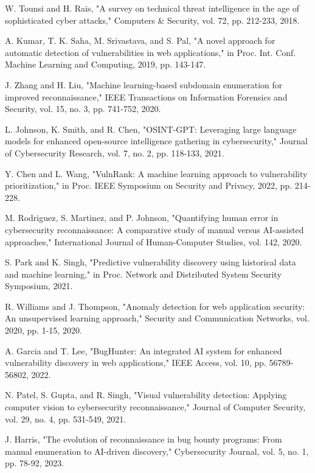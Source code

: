 \documentclass[conference]{IEEEtran}
\begin{document}

\begin{thebibliography}{00}
 W. Tounsi and H. Rais, "A survey on technical threat intelligence in the age of sophisticated cyber attacks," Computers \& Security, vol. 72, pp. 212-233, 2018.

 A. Kumar, T. K. Saha, M. Srivastava, and S. Pal, "A novel approach for automatic detection of vulnerabilities in web applications," in Proc. Int. Conf. Machine Learning and Computing, 2019, pp. 143-147.

 J. Zhang and H. Liu, "Machine learning-based subdomain enumeration for improved reconnaissance," IEEE Transactions on Information Forensics and Security, vol. 15, no. 3, pp. 741-752, 2020.

 L. Johnson, K. Smith, and R. Chen, "OSINT-GPT: Leveraging large language models for enhanced open-source intelligence gathering in cybersecurity," Journal of Cybersecurity Research, vol. 7, no. 2, pp. 118-133, 2021.

 Y. Chen and L. Wang, "VulnRank: A machine learning approach to vulnerability prioritization," in Proc. IEEE Symposium on Security and Privacy, 2022, pp. 214-228.

 M. Rodriguez, S. Martinez, and P. Johnson, "Quantifying human error in cybersecurity reconnaissance: A comparative study of manual versus AI-assisted approaches," International Journal of Human-Computer Studies, vol. 142, 2020.

 S. Park and K. Singh, "Predictive vulnerability discovery using historical data and machine learning," in Proc. Network and Distributed System Security Symposium, 2021.

 R. Williams and J. Thompson, "Anomaly detection for web application security: An unsupervised learning approach," Security and Communication Networks, vol. 2020, pp. 1-15, 2020.

 A. Garcia and T. Lee, "BugHunter: An integrated AI system for enhanced vulnerability discovery in web applications," IEEE Access, vol. 10, pp. 56789-56802, 2022.

 N. Patel, S. Gupta, and R. Singh, "Visual vulnerability detection: Applying computer vision to cybersecurity reconnaissance," Journal of Computer Security, vol. 29, no. 4, pp. 531-549, 2021.

 J. Harris, "The evolution of reconnaissance in bug bounty programs: From manual enumeration to AI-driven discovery," Cybersecurity Journal, vol. 5, no. 1, pp. 78-92, 2023.


\end{thebibliography}
\end{document}
